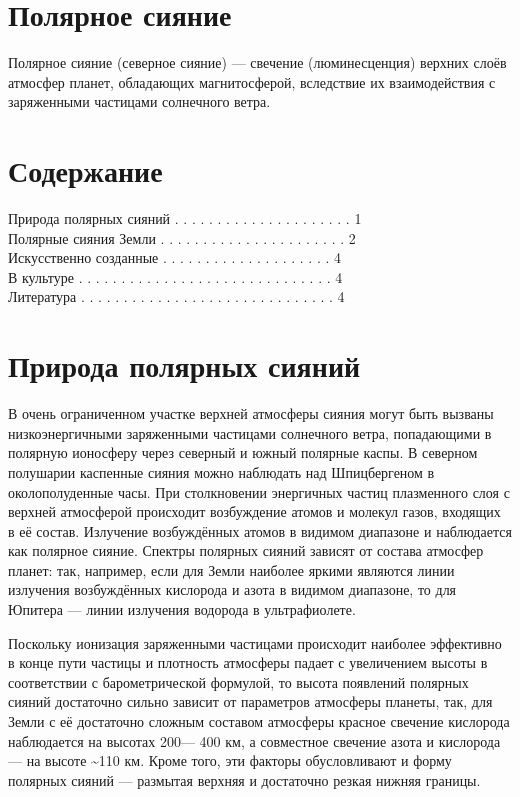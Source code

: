 \documentclass[a4paper,14pt]{article}
\begin{document}
\section{Полярное сияние}
Полярное сияние (северное сияние) — свечение (люминесценция)
верхних слоёв атмосфер планет, обладающих магнитосферой, вследствие
их взаимодействия с заряженными частицами солнечного ветра.

\tableofcontents

\section{Содержание}
Природа полярных сияний . . . . . . . . . . . . . . . . . . . . . 1\\
Полярные сияния Земли . . . . . . . . . . . . . . . . . . . . . . 2\\
Искусственно созданные . . . . . . . . . . . . . . . . . . . . 4\\
В культуре . . . . . . . . . . . . . . . . . . . . . . . . . . . . . . 4\\
Литература . . . . . . . . . . . . . . . . . . . . . . . . . . . . . . 4

\section{Природа полярных сияний}

В очень ограниченном участке верхней атмосферы сияния могут быть
вызваны низкоэнергичными заряженными частицами солнечного ветра,
попадающими в полярную ионосферу через северный и южный полярные каспы. В северном полушарии каспенные сияния можно наблюдать
над Шпицбергеном в околополуденные часы.
При столкновении энергичных частиц плазменного слоя с верхней
атмосферой происходит возбуждение атомов и молекул газов, входящих
в её состав. Излучение возбуждённых атомов в видимом диапазоне и
наблюдается как полярное сияние. Спектры полярных сияний зависят
от состава атмосфер планет: так, например, если для Земли наиболее
яркими являются линии излучения возбуждённых кислорода и азота в
видимом диапазоне, то для Юпитера — линии излучения водорода в
ультрафиолете.

Поскольку ионизация заряженными частицами происходит наиболее
эффективно в конце пути частицы и плотность атмосферы падает с увеличением высоты в соответствии с барометрической формулой, то высота
появлений полярных сияний достаточно сильно зависит от параметров
атмосферы планеты, так, для Земли с её достаточно сложным составом
атмосферы красное свечение кислорода наблюдается на высотах 200—
400 км, а совместное свечение азота и кислорода — на высоте \textasciitilde110 км.
Кроме того, эти факторы обусловливают и форму полярных сияний —
размытая верхняя и достаточно резкая нижняя границы.
\end{document}
